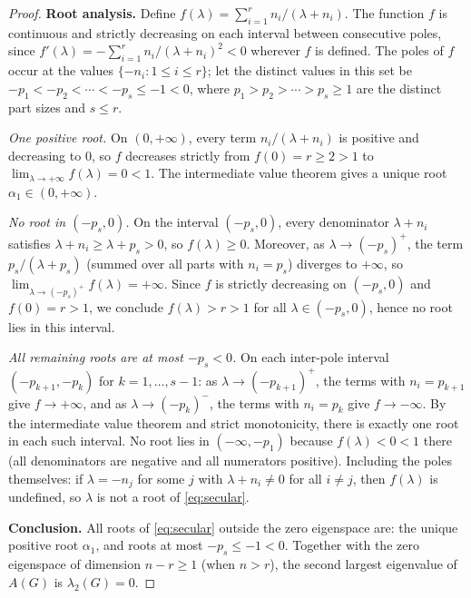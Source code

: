 \documentclass[10pt,a4paper]{amsart}
\begin{document}
\begin{proof}
\textbf{Root analysis.}
Define $f(\lambda) = \sum_{i=1}^r n_i/(\lambda + n_i)$.
The function $f$ is continuous and strictly decreasing on each interval
between consecutive poles, since
$f'(\lambda) = -\sum_{i=1}^r n_i/(\lambda + n_i)^2 < 0$ wherever $f$ is
defined.
The poles of $f$ occur at the values $\{-n_i : 1 \leq i \leq r\}$;
let the distinct values in this set be
$-p_1 < -p_2 < \cdots < -p_s \leq -1 < 0$,
where $p_1 > p_2 > \cdots > p_s \geq 1$ are the distinct part sizes
and $s \leq r$.

\textit{One positive root.}
On $(0,+\infty)$, every term $n_i/(\lambda + n_i)$ is positive and
decreasing to $0$, so $f$ decreases strictly from $f(0) = r \geq 2 > 1$
to $\lim_{\lambda \to +\infty} f(\lambda) = 0 < 1$.
The intermediate value theorem gives a unique root $\alpha_1 \in (0,+\infty)$.

\textit{No root in $(-p_s, 0)$.}
On the interval $(-p_s, 0)$, every denominator $\lambda + n_i$ satisfies
$\lambda + n_i \geq \lambda + p_s > 0$, so $f(\lambda) \geq 0$.
Moreover, as $\lambda \to (-p_s)^+$, the term $p_s/(\lambda + p_s)$
(summed over all parts with $n_i = p_s$) diverges to $+\infty$, so
$\lim_{\lambda \to (-p_s)^+} f(\lambda) = +\infty$.
Since $f$ is strictly decreasing on $(-p_s,0)$ and $f(0) = r > 1$,
we conclude $f(\lambda) > r > 1$ for all $\lambda \in (-p_s, 0)$,
hence no root lies in this interval.

\textit{All remaining roots are at most $-p_s < 0$.}
On each inter-pole interval $(-p_{k+1},-p_k)$ for $k = 1,\ldots,s-1$:
as $\lambda \to (-p_{k+1})^+$, the terms with $n_i = p_{k+1}$ give
$f \to +\infty$, and as $\lambda \to (-p_k)^-$, the terms with
$n_i = p_k$ give $f \to -\infty$.
By the intermediate value theorem and strict monotonicity, there is
exactly one root in each such interval.
No root lies in $(-\infty, -p_1)$ because $f(\lambda) < 0 < 1$ there
(all denominators are negative and all numerators positive).
Including the poles themselves: if $\lambda = -n_j$ for some $j$ with
$\lambda + n_i \neq 0$ for all $i \neq j$, then $f(\lambda)$ is undefined,
so $\lambda$ is not a root of \eqref{eq:secular}.

\textbf{Conclusion.}
All roots of \eqref{eq:secular} outside the zero eigenspace are:
the unique positive root $\alpha_1$, and roots at most $-p_s \leq -1 < 0$.
Together with the zero eigenspace of dimension $n - r \geq 1$
(when $n > r$), the second largest eigenvalue of $A(G)$ is
$\lambda_2(G) = 0$.
\end{proof}
\end{document}
